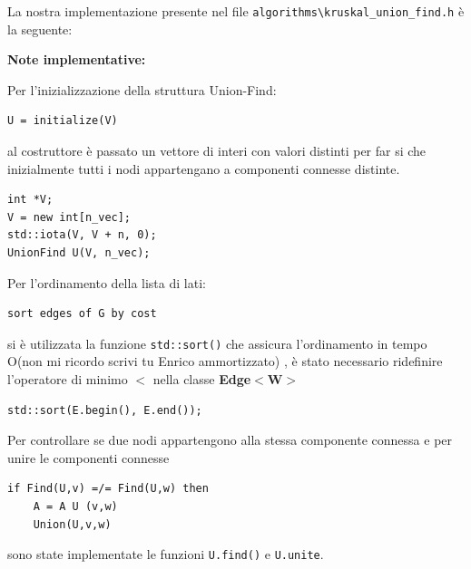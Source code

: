 \documentclass[]{article}
\begin{document}
\begin{flushleft}
La nostra implementazione presente nel file \verb|algorithms\kruskal_union_find.h| è la seguente:

\lstset{language=c++, style=mystyle}


\textbf{Note implementative:}

\medskip
Per l'inizializzazione della struttura Union-Find:

\begin{lstlisting}
U = initialize(V)
\end{lstlisting}

\smallskip
al costruttore è passato un vettore di interi con valori distinti per far si che inizialmente tutti i nodi appartengano a componenti connesse distinte.

\lstset{language=c++, style=mystyle, firstnumber=3}  	 	
\begin{lstlisting}
int *V;
V = new int[n_vec];
std::iota(V, V + n, 0);
UnionFind U(V, n_vec);
\end{lstlisting}

\medskip
Per l'ordinamento della lista di lati:

\begin{lstlisting}
sort edges of G by cost
\end{lstlisting}

\smallskip
si è utilizzata la funzione \verb|std::sort()| che assicura l'ordinamento in tempo O(non mi ricordo scrivi tu Enrico ammortizzato)%
, è stato necessario ridefinire l'operatore di minimo \textbf{$<$} nella classe \textbf{Edge$<$W$>$}
 
\lstset{language=c++, style=mystyle, firstnumber=7} 	 	
\begin{lstlisting}
std::sort(E.begin(), E.end());
\end{lstlisting}

\medskip
Per controllare se due nodi appartengono alla stessa componente connessa e per unire le componenti connesse
\begin{lstlisting}
if Find(U,v) =/= Find(U,w) then
	A = A U (v,w)
	Union(U,v,w)
\end{lstlisting}

\smallskip
sono state implementate le funzioni \verb|U.find()| e \verb|U.unite|.


\end{flushleft}
\end{document}
